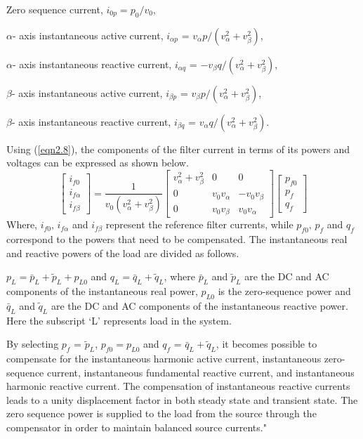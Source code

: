 Zero sequence current, $i_{0p} = p_0/v_0$,

$\alpha$- axis instantaneous active current, $i_{\alpha p}$ = ${v_\alpha} p/({v_\alpha^2 + v_\beta^2})$,

$\alpha$- axis instantaneous reactive current, $i_{\alpha q}$ = $-{v_\beta} q/({v_\alpha^2 + v_\beta^2})$,

$\beta$- axis instantaneous active current, $i_{\beta p}$ = ${v_\beta} p/({v_\alpha^2 + v_\beta^2})$,

$\beta$- axis instantaneous reactive current, $i_{\beta q}$ = ${v_\alpha} q/({v_\alpha^2 + v_\beta^2})$.

Using (\ref{eqn2.8}), the components of the filter current in terms of its powers and voltages can be expressed as shown below.
\begin{equation}
\begin{bmatrix} i_{f0} \\i_{f \alpha}  \\
i_{f \beta}
\end{bmatrix} = \frac{1}{v_0 ({v_\alpha^2 + v_\beta^2})}  \begin{bmatrix} {v_\alpha^2 + v_\beta^2} & 0 & 0 \\ 0 & v_0 v_\alpha & -v_0 v_\beta \\ 0 & v_0 v_\beta & v_0 v_\alpha
\end{bmatrix} \begin{bmatrix} p_{f0} \\p_f \\ q_f
\end{bmatrix}
\label{eqn2.12}
\end{equation}
Where, $i_{f0}, \, i_{f \alpha}$ and $i_{f \beta}$ represent the reference filter currents, while $p_{f0}, \, p_f$ and $q_f$ correspond to the powers that need to be compensated. The instantaneous real and reactive powers of the load are divided as follows.

$p_L=\bar{p}_L + \tilde{p}_L + p_{L0}$ and $q_L=\bar{q}_L + \tilde{q}_L$, where $\bar{p}_L$ and $\tilde{p}_L$ are the DC and AC components of the instantaneous real power, $p_{L0}$ is the zero-sequence power and  $\bar{q}_L$ and $\tilde{q}_L$ are the DC and AC components of the instantaneous reactive power. Here the subscript `L' represents load in the system.

By selecting $p_f$ = $\tilde{p}_L$, $p_{f0} = p_{L0}$ and $q_f$ = $\bar{q}_L + \tilde{q}_L$, it becomes possible to compensate for the instantaneous harmonic active current, instantaneous zero-sequence current, instantaneous fundamental reactive current, and instantaneous harmonic reactive current. The compensation of instantaneous reactive currents leads to a unity displacement factor in both steady state and transient state. The zero sequence power is supplied to the load from the source through the compensator in order to maintain balanced source currents." 
 \vspace*{-1cm}
